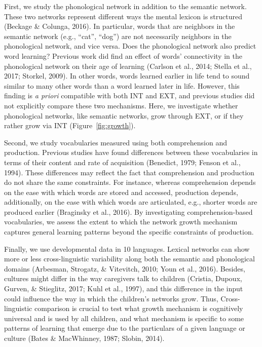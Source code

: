 \documentclass[english,floatsintext,man]{apa6}
\theoremstyle{definition}
\theoremstyle{definition}
\theoremstyle{definition}
\theoremstyle{remark}
\begin{document}
First, we study the phonological network in addition to the semantic
network. These two networks represent different ways the mental lexicon
is structured (Beckage \& Colunga, 2016). In particular, words that are
neighbors in the semantic network (e.g., \enquote{cat}, \enquote{dog})
are not necessarily neighbors in the phonological network, and vice
versa. Does the phonological network also predict word learning?
Previous work did find an effect of words' connectivity in the
phonological network on their age of learning (Carlson et al., 2014;
Stella et al., 2017; Storkel, 2009). In other words, words learned
earlier in life tend to sound similar to many other words than a word
learned later in life. However, this finding is \emph{a priori}
compatible with both INT and EXT, and previous studies did not
explicitly compare these two mechanisms. Here, we investigate whether
phonological networks, like semantic networks, grow through EXT, or if
they rather grow via INT (Figure~\ref{fig:growth}).

Second, we study vocabularies measured using both comprehension and
production. Previous studies have found differences between these
vocabularies in terms of their content and rate of acquisition
(Benedict, 1979; Fenson et al., 1994). These differences may reflect the
fact that comprehension and production do not share the same
constraints. For instance, whereas comprehension depends on the ease
with which words are stored and accessed, production depends,
additionally, on the ease with which words are articulated, e.g.,
shorter words are produced earlier (Braginsky et al., 2016). By
investigating comprehension-based vocabularies, we assess the extent to
which the network growth mechanism captures general learning patterns
beyond the specific constraints of production.

Finally, we use developmental data in 10 languages. Lexical networks can
show more or less cross-linguistic variability along both the semantic
and phonological domains (Arbesman, Strogatz, \& Vitevitch, 2010; Youn
et al., 2016). Besides, cultures might differ in the way caregivers talk
to children (Cristia, Dupoux, Gurven, \& Stieglitz, 2017; Kuhl et al.,
1997), and this difference in the input could influence the way in which
the children's networks grow. Thus, Cross-linguistic comparison is
crucial to test what growth mechanism is cognitively universal and is
used by all children, and what mechanism is specific to some patterns of
learning that emerge due to the particulars of a given language or
culture (Bates \& MacWhinney, 1987; Slobin, 2014).
\end{document}
